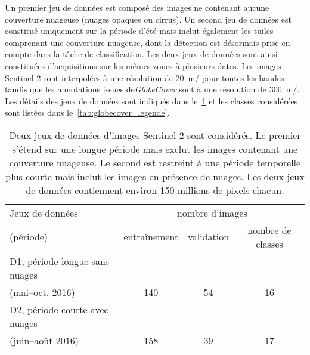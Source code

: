 Un premier jeu de données est composé des images ne contenant aucune couverture nuageuse (nuages opaques ou cirrus). Un second jeu de données est constitué uniquement sur la période d'été mais inclut également les tuiles comprenant une couverture nuageuse, dont la détection est désormais prise en compte dans la tâche de classification. Les deux jeux de données sont ainsi constituées d'acquisitions sur les mêmes zones à plusieurs dates. Les images Sentinel-2 sont interpolées à une résolution de \SI{20}{\meter/\px} pour toutes les bandes tandis que les annotations issues de\emph{GlobeCover} sont à une résolution de \SI{300}{\meter/\px}. Les détails des jeux de données sont indiqués dans le~\cref{tab:datasets} et les classes considérées sont listées dans le~\cref{tab:globecover_legende}.

\begin{table}[h]
\caption{Deux jeux de données d'images Sentinel-2 sont considérés. Le premier s'étend sur une longue période mais exclut les images contenant une couverture nuageuse. Le second est restreint à une période temporelle plus courte mais inclut les images en présence de nuages. Les deux jeux de données contiennent environ 150 millions de pixels chacun.}
\label{tab:datasets}
\begin{tabular}{lccc}
\toprule
Jeux de données & \multicolumn{3}{c}{nombre d'images}\\
(période)  & entraînement & validation  & nombre de classes \\
\midrule
D1, période longue sans nuages & & & \\
 (mai--oct. 2016) & 140 & 54 & 16 \\
\midrule
D2, période courte avec nuages & & & \\
(juin--août 2016) & 158 & 39 & 17 \\
\bottomrule
\end{tabular}
\end{table}

